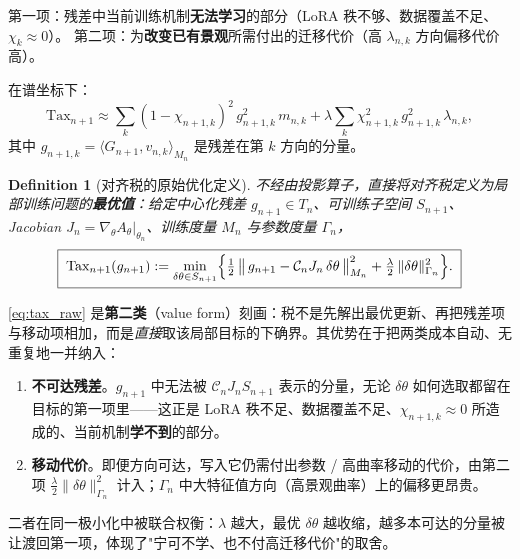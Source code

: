 \documentclass[11pt,a4paper]{article}
\newtheorem{definition}[theorem]{Definition}
\newcommand{\Center}{\mathcal{C}}
\begin{document}
第一项：残差中当前训练机制\textbf{无法学习}的部分（LoRA 秩不够、数据覆盖不足、$\chi_k \approx 0$）。
第二项：为\textbf{改变已有景观}所需付出的迁移代价（高 $\lambda_{n,k}$ 方向偏移代价高）。

在谱坐标下：
\begin{equation}\label{eq:tax_spectral}
\text{Tax}_{n+1} \approx \sum_k (1-\chi_{n+1,k})^2\,g_{n+1,k}^2\,m_{n,k} + \lambda\sum_k \chi_{n+1,k}^2\,g_{n+1,k}^2\,\lambda_{n,k},
\end{equation}
其中 $g_{n+1,k} = \langle G_{n+1}, v_{n,k}\rangle_{M_n}$ 是残差在第 $k$ 方向的分量。


\begin{definition}[对齐税的原始优化定义]\label{def:tax_raw}
不经由投影算子，直接将对齐税定义为局部训练问题的\textbf{最优值}：给定中心化残差 $g_{n+1}\in T_n$、可训练子空间 $S_{n+1}$、Jacobian $J_n=\nabla_\theta A_\theta|_{\theta_n}$、训练度量 $M_n$ 与参数度量 $\Gamma_n$，
\begin{equation}\label{eq:tax_raw}
\boxed{\;
\text{Tax}_{n+1}(g_{n+1})
:= \min_{\delta\theta\in S_{n+1}}
\Bigl\{
\tfrac12\,\bigl\|\,g_{n+1}-\Center_n J_n\,\delta\theta\,\bigr\|_{M_n}^2
+\tfrac{\lambda}{2}\,\|\delta\theta\|_{\Gamma_n}^2
\Bigr\}.
\;}
\end{equation}
\end{definition}

\eqref{eq:tax_raw} 是\textbf{第二类}（value form）刻画：税不是先解出最优更新、再把残差项与移动项相加，而是\emph{直接}取该局部目标的下确界。其优势在于把两类成本自动、无重复地一并纳入：

\begin{enumerate}
\item \textbf{不可达残差}。$g_{n+1}$ 中无法被 $\Center_n J_n S_{n+1}$ 表示的分量，无论 $\delta\theta$ 如何选取都留在目标的第一项里——这正是 LoRA 秩不足、数据覆盖不足、$\chi_{n+1,k}\approx0$ 所造成的、当前机制\textbf{学不到}的部分。
\item \textbf{移动代价}。即便方向可达，写入它仍需付出参数 / 高曲率移动的代价，由第二项 $\tfrac{\lambda}{2}\|\delta\theta\|_{\Gamma_n}^2$ 计入；$\Gamma_n$ 中大特征值方向（高景观曲率）上的偏移更昂贵。
\end{enumerate}

二者在同一极小化中被联合权衡：$\lambda$ 越大，最优 $\delta\theta$ 越收缩，越多本可达的分量被让渡回第一项，体现了"宁可不学、也不付高迁移代价"的取舍。
\end{document}
